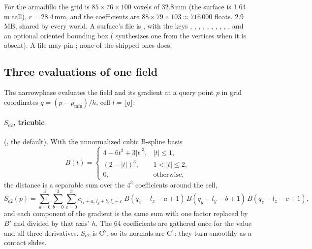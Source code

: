For the armadillo the grid is $85 \times 76 \times 100$ voxels of 32.8\,mm (the surface is 1.64\,m tall), $r = 28.4$\,mm, and the coefficients are $88 \times 79 \times 103 \approx 716\,000$ floats, 2.9\,MB, shared by every world. A surface's file is , with the keys , , , , , , , , , ,  and an optional oriented bounding box  ( synthesizes one from the vertices when it is absent). A file may pin ; none of the shipped ones does.

\subsection{Three evaluations of one field}\label{sec:eval}

The narrowphase evaluates the field and its gradient at a query point $p$ in grid coordinates $q = (p - p_{\min})/h$, cell $l = \lfloor q\rfloor$:

\paragraph{$S_{\mathrm{c2}}$, tricubic} (, the default). With the unnormalized cubic B-spline basis
\begin{equation}\label{eq:basis}
B(t) = \begin{cases} 4 - 6t^2 + 3\lvert t\rvert^3, & \lvert t\rvert \le 1, \\ (2 - \lvert t\rvert)^3, & 1 < \lvert t\rvert \le 2, \\ 0, & \text{otherwise}, \end{cases}
\end{equation}
the distance is a separable sum over the $4^3$ coefficients around the cell,
\begin{equation}\label{eq:c2}
S_{\mathrm{c2}}(p) = \sum_{a=0}^{3}\sum_{b=0}^{3}\sum_{c=0}^{3} c_{l_x+a,\,l_y+b,\,l_z+c}\; B(q_x - l_x - a + 1)\, B(q_y - l_y - b + 1)\, B(q_z - l_z - c + 1),
\end{equation}
and each component of the gradient is the same sum with one factor replaced by $B'$ and divided by that axis' $h$. The 64 coefficients are gathered once for the value and all three derivatives. $S_{\mathrm{c2}}$ is C$^2$, so its normals are C$^1$: they turn smoothly as a contact slides.

